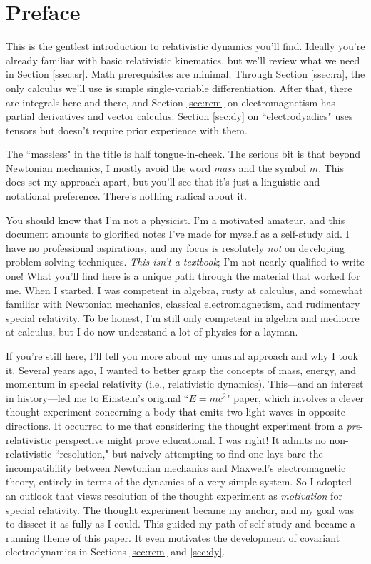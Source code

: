 \documentclass[12pt]{article}
\begin{document}
\printnomenclature

\clearpage

\section*{Preface}\label{sec:p}

This is the gentlest introduction to relativistic dynamics you'll find. Ideally you're already familiar with basic relativistic kinematics, but we'll review what we need in Section \ref{ssec:sr}. Math prerequisites are minimal. Through Section \ref{ssec:ra}, the only calculus we'll use is simple single-variable differentiation. After that, there are integrals here and there, and Section \ref{sec:rem} on electromagnetism has partial derivatives and vector calculus. Section \ref{sec:dy} on ``electrodyadics" uses tensors but doesn't require prior experience with them.

The ``massless" in the title is half tongue-in-cheek. The serious bit is that beyond Newtonian mechanics, I mostly avoid the word \emph{mass} and the symbol $m$. This does set my approach apart, but you'll see that it's just a linguistic and notational preference. There's nothing radical about it.

You should know that I'm not a physicist. I'm a motivated amateur, and this document amounts to glorified notes I've made for myself as a self-study aid. I have no professional aspirations, and my focus is resolutely \emph{not} on developing problem-solving techniques. \emph{This isn't a textbook}; I'm not nearly qualified to write one! What you'll find here is a unique path through the material that worked for me. When I started, I was competent in algebra, rusty at calculus, and somewhat familiar with Newtonian mechanics, classical electromagnetism, and rudimentary special relativity. To be honest, I'm still only competent in algebra and mediocre at calculus, but I do now understand a lot of physics for a layman.

If you're still here, I'll tell you more about my unusual approach and why I took it. Several years ago, I wanted to better grasp the concepts of mass, energy, and momentum in special relativity (i.e., relativistic dynamics). This---and an interest in history---led me to Einstein's original ``$E = mc^2$" paper, which involves a clever thought experiment concerning a body that emits two light waves in opposite directions. It occurred to me that considering the thought experiment from a \emph{pre}-relativistic perspective might prove educational. I was right! It admits no non-relativistic ``resolution," but naively attempting to find one lays bare the incompatibility between Newtonian mechanics and Maxwell's electromagnetic theory, entirely in terms of the dynamics of a very simple system. So I adopted an outlook that views resolution of the thought experiment as \emph{motivation} for special relativity. The thought experiment became my anchor, and my goal was to dissect it as fully as I could. This guided my path of self-study and became a running theme of this paper. It even motivates the development of covariant electrodynamics in Sections \ref{sec:rem} and \ref{sec:dy}.
\end{document}
